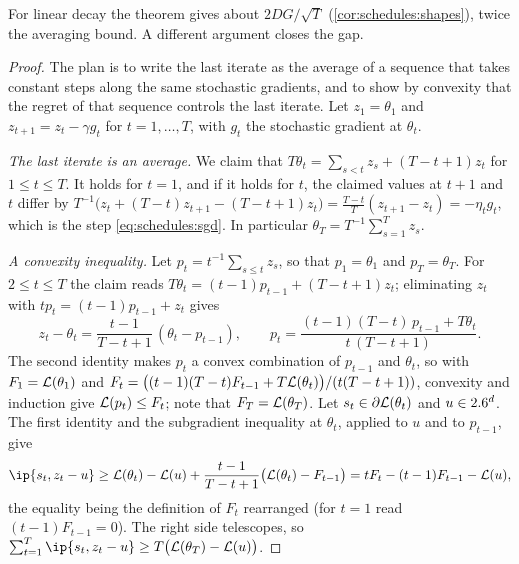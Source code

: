 \begin{refsection}
For linear decay the theorem gives about $2DG/\sqrt T$ (\cref{cor:schedules:shapes}), twice the averaging bound. A different argument closes the gap.


\begin{proof}
The plan is to write the last iterate as the average of a sequence that takes constant steps along the same stochastic gradients, and to show by convexity that the regret of that sequence controls the last iterate. Let $z_1=\theta_1$ and $z_{t+1}=z_t-\gamma g_t$ for $t=1,\dots,T$, with $g_t$ the stochastic gradient at $\theta_t$.

\emph{The last iterate is an average.} We claim that $T\theta_t=\sum_{s<t}z_s+(T-t+1)z_t$ for $1\le t\le T$. It holds for $t=1$, and if it holds for $t$, the claimed values at $t+1$ and $t$ differ by $T^{-1}\bigl(z_t+(T-t)z_{t+1}-(T-t+1)z_t\bigr)=\frac{T-t}T(z_{t+1}-z_t)=-\eta_tg_t$, which is the step \eqref{eq:schedules:sgd}. In particular $\theta_T=T^{-1}\sum_{s=1}^Tz_s$.

\emph{A convexity inequality.} Let $p_t=t^{-1}\sum_{s\le t}z_s$, so that $p_1=\theta_1$ and $p_T=\theta_T$. For $2\le t\le T$ the claim reads $T\theta_t=(t-1)p_{t-1}+(T-t+1)z_t$; eliminating $z_t$ with $tp_t=(t-1)p_{t-1}+z_t$ gives
\[
  z_t-\theta_t=\frac{t-1}{T-t+1}\,(\theta_t-p_{t-1}),\qquad p_t=\frac{(t-1)(T-t)\,p_{t-1}+T\theta_t}{t\,(T-t+1)} .
\]
The second identity makes $p_t$ a convex combination of $p_{t-1}$ and $\theta_t$, so with $F_1=\mathcal{L}(\theta_1)$ and $F_t=\bigl((t-1)(T-t)F_{t-1}+T\mathcal{L}(\theta_t)\bigr)/(t(T-t+1))$, convexity and induction give $\mathcal{L}(p_t)\le F_t$; note that $F_T=\mathcal{L}(\theta_T)$. Let $s_t\in\partial\mathcal{L}(\theta_t)$ and $u\in2.6^d$. The first identity and the subgradient inequality at $\theta_t$, applied to $u$ and to $p_{t-1}$, give
\[
  \ip{s_t,z_t-u}\ge\Loss(\theta_t)-\Loss(u)+\frac{t-1}{T-t+1}\bigl(\Loss(\theta_t)-F_{t-1}\bigr)=tF_t-(t-1)F_{t-1}-\Loss(u),
\]
the equality being the definition of $F_t$ rearranged (for $t=1$ read $(t-1)F_{t-1}=0$). The right side telescopes, so $\sum_{t=1}^{T}\ip{s_t,z_t-u}\ge T\bigl(\Loss(\theta_T)-\Loss(u)\bigr)$.


\end{proof}
\end{refsection}

